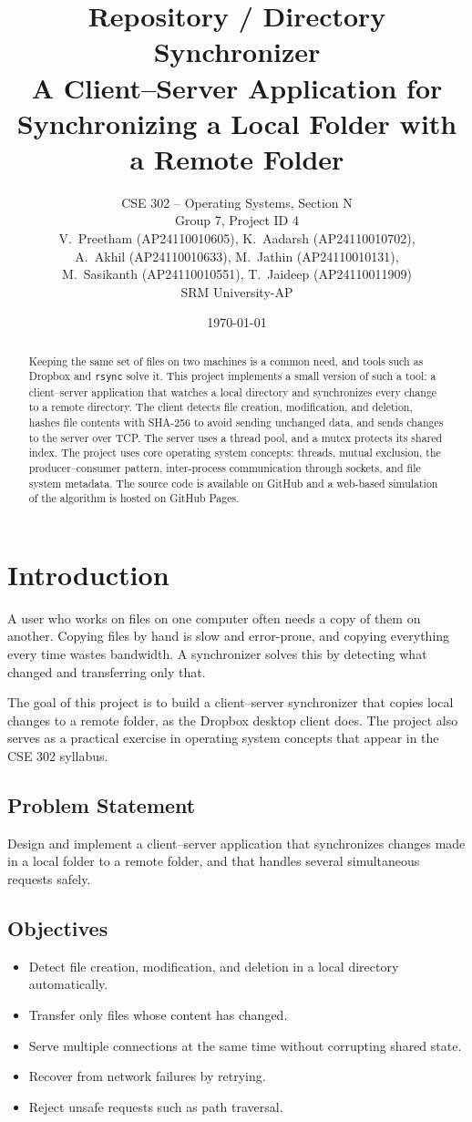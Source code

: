 \documentclass[12pt,a4paper]{article}
\title{\textbf{Repository / Directory Synchronizer}\\[4pt]
\large A Client--Server Application for Synchronizing a Local Folder with a Remote Folder}
\author{CSE 302 -- Operating Systems, Section N\\
Group 7, Project ID 4\\[4pt]
V.~Preetham (AP24110010605), K.~Aadarsh (AP24110010702),\\
A.~Akhil (AP24110010633), M.~Jathin (AP24110010131),\\
M.~Sasikanth (AP24110010551), T.~Jaideep (AP24110011909)\\[4pt]
SRM University-AP}
\date{\today}
\begin{document}
\maketitle

\begin{abstract}
Keeping the same set of files on two machines is a common need, and tools such as Dropbox and \texttt{rsync} solve it. This project implements a small version of such a tool: a client--server application that watches a local directory and synchronizes every change to a remote directory. The client detects file creation, modification, and deletion, hashes file contents with SHA-256 to avoid sending unchanged data, and sends changes to the server over TCP. The server uses a thread pool, and a mutex protects its shared index. The project uses core operating system concepts: threads, mutual exclusion, the producer--consumer pattern, inter-process communication through sockets, and file system metadata. The source code is available on GitHub and a web-based simulation of the algorithm is hosted on GitHub Pages.
\end{abstract}

\section{Introduction}
A user who works on files on one computer often needs a copy of them on another. Copying files by hand is slow and error-prone, and copying everything every time wastes bandwidth. A synchronizer solves this by detecting what changed and transferring only that.

The goal of this project is to build a client--server synchronizer that copies local changes to a remote folder, as the Dropbox desktop client does. The project also serves as a practical exercise in operating system concepts that appear in the CSE 302 syllabus.

\subsection{Problem Statement}
Design and implement a client--server application that synchronizes changes made in a local folder to a remote folder, and that handles several simultaneous requests safely.

\subsection{Objectives}
\begin{itemize}
\item Detect file creation, modification, and deletion in a local directory automatically.
\item Transfer only files whose content has changed.
\item Serve multiple connections at the same time without corrupting shared state.
\item Recover from network failures by retrying.
\item Reject unsafe requests such as path traversal.
\end{itemize}
\end{document}
